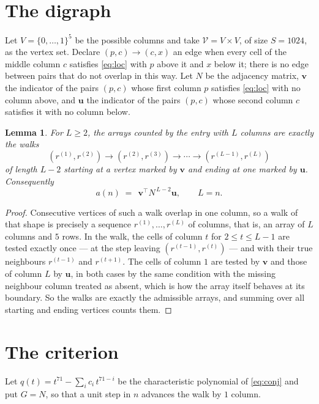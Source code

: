 \documentclass[11pt,a4paper]{article}
\theoremstyle{plain}
\newtheorem{lemma}[theorem]{Lemma}
\theoremstyle{definition}
\begin{document}
\section{The digraph}

Let $V=\{0,\dots,1\}^{5}$ be the possible columns and take
$\mathcal V=V\times V$, of size $S=1024$, as the vertex set. Declare $(p,c)\to(c,x)$ an edge
when every cell of the middle column $c$ satisfies \eqref{eq:loc} with $p$ above it and $x$
below it; there is no edge between pairs that do not overlap in this way. Let $N$ be the
adjacency matrix, $\mathbf{v}$ the indicator of the pairs $(p,c)$ whose first column $p$
satisfies \eqref{eq:loc} with no column above, and $\mathbf{u}$ the indicator of
the pairs $(p,c)$ whose second column $c$ satisfies it with no column below.

\begin{lemma}\label{lem:walk}
For $L\ge2$, the arrays counted by the entry with $L$ columns are exactly the walks
\[
(r^{(1)},r^{(2)})\to(r^{(2)},r^{(3)})\to\cdots\to(r^{(L-1)},r^{(L)})
\]
of length $L-2$ starting at a vertex marked by $\mathbf{v}$ and ending at one marked by
$\mathbf{u}$. Consequently
\[
a(n)\;=\;\,\mathbf{v}^{\!\top}N^{\,L-2}\mathbf{u},\qquad L=n .
\]
\end{lemma}

\begin{proof}
Consecutive vertices of such a walk overlap in one column, so a walk of that shape is
precisely a sequence $r^{(1)},\dots,r^{(L)}$ of columns, that is, an array of $L$ columns
and $5$ rows. In the walk, the cells of column $t$ for $2\le t\le L-1$ are tested
exactly once --- at the step leaving $(r^{(t-1)},r^{(t)})$ --- and with their true
neighbours $r^{(t-1)}$ and $r^{(t+1)}$. The cells of column $1$ are tested by
$\mathbf{v}$ and those of column $L$ by $\mathbf{u}$, in both cases by the same condition
with the missing neighbour column treated as absent, which is how the array itself behaves at
its boundary. So the walks are exactly the admissible arrays, and summing over all starting
and ending vertices counts them.
\end{proof}

\section{The criterion}

Let $q(t)=t^{71}-\sum_i c_i\,t^{71-i}$ be the characteristic polynomial of
\eqref{eq:conj} and put $G=N$, so that a unit step in $n$ advances the walk by
$1$ column.
\end{document}
